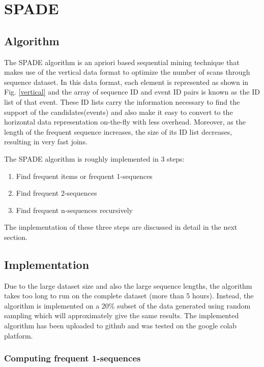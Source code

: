 \section{SPADE}

\subsection{Algorithm}
The SPADE algorithm is an apriori based sequential mining technique that makes use of the vertical data format to optimize the number of scans through sequence dataset. In this data format, each element is represented as shown in Fig. \ref{vertical} and the array of sequence ID and event ID pairs is known as the ID list of that event. These ID lists carry the information necessary to find the support of the candidates(events) and also make it easy to convert to the horizontal data representation on-the-fly with less overhead. Moreover, as the length of the frequent sequence increases, the size of its ID list decreases, resulting in very fast joins.

The SPADE algorithm is roughly implemented in 3 steps:
\begin{enumerate}
    \item Find frequent items or frequent 1-sequences
    \item Find frequent 2-sequences
    \item Find frequent n-sequences recursively
\end{enumerate}

The implementation of these three steps are discussed in detail in the next section.

\subsection{Implementation}

Due to the large dataset size and also the large sequence lengths, the algorithm takes too long to run on the complete dataset (more than 5 hours). Instead, the algorithm is implemented on a 20\% subset of the data generated using random sampling which will approximately give the same results.
The implemented algorithm has been uploaded to github \cite{b3} and was tested on the google colab platform.

\subsubsection{Computing frequent 1-sequences}

